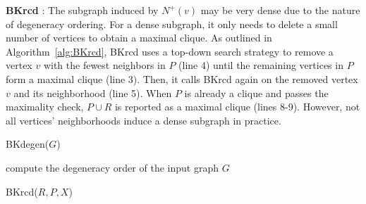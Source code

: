 \documentclass[sigconf, nonacm]{acmart}
\begin{document}
\noindent\textbf{BKrcd} \cite{li2019fast}: %
The subgraph induced by $N^+(v)$ may be very dense due to the nature of degeneracy ordering. 
For a dense subgraph, it only needs to delete a small number of vertices to obtain a maximal clique. As outlined in Algorithm~\ref{alg:BKrcd}, BKrcd uses a top-down search strategy to remove a vertex $v$ with the fewest neighbors in $P$ (line 4) until the remaining vertices in $P$  form a maximal clique (line 3). Then, it calls BKrcd again on the removed vertex $v$ and its neighborhood (line 5). When $P$ is already a clique and passes the maximality check, $P \cup R$ is reported as a maximal clique (lines 8-9). However, not all vertices' neighborhoods 
induce a dense subgraph
in practice. 


\begin{algorithm}[t]
    \caption{BKdegen($G$)}
    \label{alg:BKdegen}
    \nl compute the degeneracy order of the input graph $G$ \\
    \nl {}
\end{algorithm}

\begin{algorithm}[t]
    \caption{BKrcd($R,P,X$)}
    \label{alg:BKrcd}
    \nl {}
    \nl {}
    \nl {}
\end{algorithm}
\end{document}
